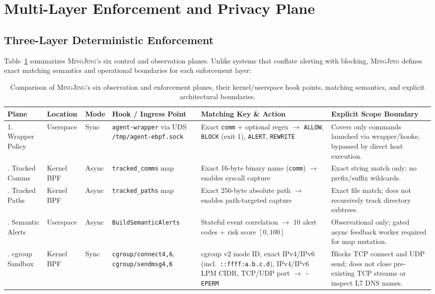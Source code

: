 \documentclass[10pt,twocolumn,letterpaper]{article}
\newcommand{\sys}{\textsc{MingJing}}
\newcommand{\code}[1]{\texttt{\small #1}}
\begin{document}
\section{Multi-Layer Enforcement and Privacy Plane}
\label{sec:enforcement}

\subsection{Three-Layer Deterministic Enforcement}
Table~\ref{tab:enforcement} summarizes \sys{}'s six control and observation planes. Unlike systems that conflate alerting with blocking, \sys{} defines exact matching semantics and operational boundaries for each enforcement layer:

\begin{table}[t]
\centering
\footnotesize
\caption{Comparison of \sys{}'s six observation and enforcement planes, their kernel/userspace hook points, matching semantics, and explicit architectural boundaries.}
\label{tab:enforcement}
\begin{tabularx}{\textwidth}{@{}llllXX@{}}
\toprule
\textbf{Plane} & \textbf{Location} & \textbf{Mode} & \textbf{Hook / Ingress Point} & \textbf{Matching Key \& Action} & \textbf{Explicit Scope Boundary} \\
\midrule
1. Wrapper Policy & Userspace & Sync & \code{agent-wrapper} via UDS \code{/tmp/agent-ebpf.sock} & Exact \code{comm} + optional regex $\to$ \code{ALLOW}, \code{BLOCK} (exit 1), \code{ALERT}, \code{REWRITE} & Covers only commands launched via wrapper/hooks; bypassed by direct host execution. \\
\addlinespace[2pt]
2. Tracked Comms & Kernel BPF & Async & \code{tracked\_comms} map & Exact 16-byte binary name (\code{comm}) $\to$ enables syscall capture & Exact string match only; no prefix/suffix wildcards. \\
\addlinespace[2pt]
3. Tracked Paths & Kernel BPF & Async & \code{tracked\_paths} map & Exact 256-byte absolute path $\to$ enables path-targeted capture & Exact file match; does not recursively track directory subtrees. \\
\addlinespace[2pt]
4. Semantic Alerts & Userspace & Async & \code{BuildSemanticAlerts} & Stateful event correlation $\to$ 10 alert codes + risk score $[0,100]$ & Observational only; gated async feedback worker required for map mutation. \\
\addlinespace[2pt]
5. cgroup Sandbox & Kernel BPF & Sync & \code{cgroup/connect4,6}, \code{cgroup/sendmsg4,6} & cgroup v2 inode ID, exact IPv4/IPv6 (incl.\ \code{::ffff:a.b.c.d}), IPv4/IPv6 LPM CIDR, TCP/UDP port $\to$ \code{-EPERM} & Blocks TCP connect and UDP send; does not close pre-existing TCP streams or inspect L7 DNS names. \\

\end{tabularx}
\end{table}
\end{document}
